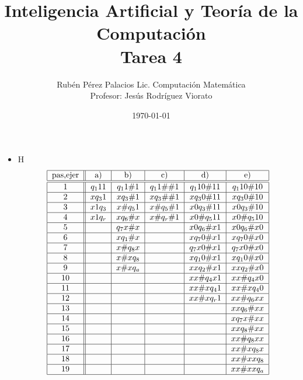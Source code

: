 \documentclass[letterpaper]{article}
\title{Inteligencia Artificial y Teoría de la Computación \\ Tarea 4}
\author{Rubén Pérez Palacios Lic. Computación Matemática\\Profesor: Jesús Rodríguez Viorato}
\date{\today}
\theoremstyle{definition}
\theoremstyle{lemathm}
\theoremstyle{lemathm}
\theoremstyle{lemathm}
\theoremstyle{lemademthm}
\newcommand{\1}{\mathbbm{1}}
\begin{document}
	\maketitle

	\begin{itemize}
		\item H
		\[\begin{tabular}{|c||c|c|c|c|c|}
			\hline
			pas,ejer & a) & b)  & c) & d) & e)\\
			\hline
			\hline
			1  & $q_{1}11$ & $q_{1}1\#1$ & $q_{1}1\#\#1$ & $q_{1}10\#11$ & $q_{1}10\#10$\\
			\hline
			2  & $xq_{3}1$ & $xq_{3}\#1$ & $xq_{3}\#\#1$ & $xq_{3}0\#11$ & $xq_{3}0\#10$\\
			\hline
			3  & $x1q_{3}$ & $x\#q_{5}1$ & $x\#q_{5}\#1$ & $x0q_{3}\#11$ & $x0q_{3}\#10$\\
			\hline
			4  & $x1q_{r}$ & $xq_{6}\#x$ & $x\#q_{r}\#1$ & $x0\#q_{5}11$ & $x0\#q_{5}10$\\
			\hline
			5  &    	   & $q_{7}x\#x$ & 			     & $x0q_{6}\#x1$ & $x0q_{6}\#x0$\\
			\hline
			6  &    	   & $xq_{1}\#x$ & 			     & $xq_{7}0\#x1$ & $xq_{7}0\#x0$\\
			\hline
			7  &    	   & $x\#q_{8}x$ & 			     & $q_{7}x0\#x1$ & $q_{7}x0\#x0$\\
			\hline
			8  &    	   & $x\#xq_{8}$ & 			     & $xq_{1}0\#x1$ & $xq_{1}0\#x0$\\
			\hline
			9  &    	   & $x\#xq_{a}$ & 			     & $xxq_{2}\#x1$ & $xxq_{2}\#x0$\\
			\hline
			10 &    	   &		     & 			     & $xx\#q_{4}x1$ & $xx\#q_{4}x0$\\
			\hline
			11 &    	   &		     & 			     & $xx\#xq_{4}1$ & $xx\#xq_{4}0$\\
			\hline
			12 &    	   &		     & 			     & $xx\#xq_{r}1$ & $xx\#q_{6}xx$\\
			\hline
			13 &		   &		     & 			     & 			     & $xxq_{6}\#xx$\\
			\hline
			14 &		   &		     & 			     & 			     & $xq_{7}x\#xx$\\
			\hline
			15 &		   &		     & 			     & 			     & $xxq_{8}\#xx$\\
			\hline
			16 &		   &		     & 			     & 			     & $xx\#q_{8}xx$\\
			\hline
			17 &		   &		     & 			     & 			     & $xx\#xq_{8}x$\\
			\hline
			18 &		   &		     & 			     & 			     & $xx\#xxq_{8}$\\
			\hline
			19 &		   &		     & 			     & 			     & $xx\#xxq_{a}$\\
			\hline
		\end{tabular}\]		   
	\end{itemize}
\end{document}
